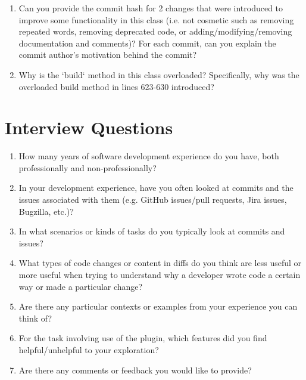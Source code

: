 \begin{enumerate}
    \item Can you provide the commit hash for 2 changes that were introduced to improve some functionality in this class (i.e. not cosmetic such as removing repeated words, removing deprecated code, or adding/modifying/removing documentation and comments)? For each commit, can you explain the commit author’s motivation behind the commit?
    \item Why is the `build` method in this class overloaded? Specifically, why was the overloaded build method in lines 623-630 introduced?
\end{enumerate}

\section{Interview Questions}
\label{sec:Interview-Questions}

\begin{enumerate}
    \item How many years of software development experience do you have, both professionally and non-professionally?
    \item In your development experience, have you often looked at commits and the issues associated with them (e.g. GitHub issues/pull requests, Jira issues, Bugzilla, etc.)?
        \item In what scenarios or kinds of tasks do you typically look at commits and issues?
    \item What types of code changes or content in diffs do you think are less useful or more useful when trying to understand why a developer wrote code a certain way or made a particular change? 
    \item Are there any particular contexts or examples from your experience you can think of?
    \item For the task involving use of the plugin, which features did you find helpful/unhelpful to your exploration?
    \item Are there any comments or feedback you would like to provide?
\end{enumerate}

\endinput

This would be any supporting material not central to the dissertation.
For example:
\begin{itemize}
\item additional details of methodology and/or data;
\item diagrams of specialized equipment developed.;
\item copies of questionnaires and survey instruments.
\end{itemize}